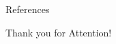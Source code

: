\documentclass[usenames,dvipsnames]{beamer}
\begin{document}
	\maketitle

	
	

	\ifthenelse%
		{}
		{\nocite{*}}
		{}

	\begin{frame}[allowframebreaks]{References}

		\printbibliography%


	\end{frame}


	\begin{frame}[standout]

		\Huge\alert{Thank you for Attention!}

	\end{frame}

	\maketitle
\end{document}
